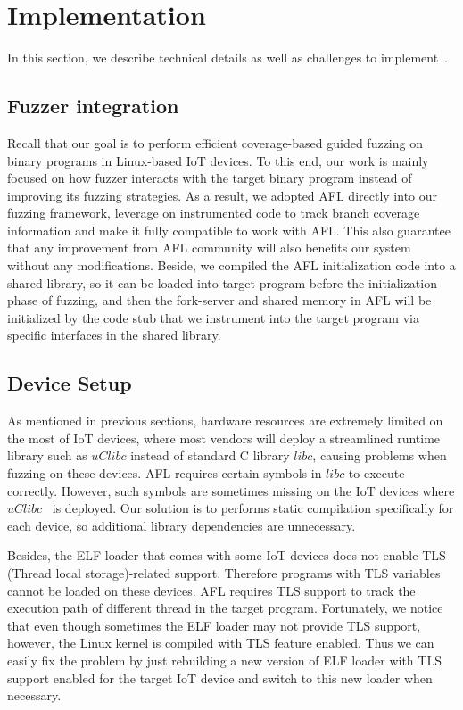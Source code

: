 \section{Implementation}\label{sec:impl}
In this section, we describe technical details as well as challenges to implement~\sysname. 

\subsection{Fuzzer integration}\label{sec:impl:integ}
Recall that our goal is to perform efficient coverage-based guided fuzzing on binary programs in Linux-based IoT devices. To this end, our work is mainly focused on
how fuzzer interacts with the target binary program instead of improving its fuzzing strategies. As a result, we adopted AFL directly into our fuzzing framework, leverage on instrumented code to track branch coverage information and make it fully compatible to work with AFL. This also guarantee that any improvement from AFL community will also benefits our system without any modifications. Beside, we compiled the AFL initialization code into a shared library, so it can be loaded into target program before the initialization phase of fuzzing, and then the fork-server and shared memory in AFL will be initialized by the code stub that we instrument into the target program via specific interfaces in the shared library.

\subsection{Device Setup}

As mentioned in previous sections, hardware resources are extremely limited on the most of IoT devices, where most vendors will deploy a streamlined runtime library such as $uClibc$ instead of standard C library $libc$, causing problems when fuzzing on these devices. AFL requires certain symbols in $libc$ to execute correctly. However, such symbols are sometimes missing on the IoT devices where $uClibc$~\cite{uclibc} is deployed. Our solution is to performs static compilation specifically for each device, so additional library dependencies are unnecessary.  

Besides, the ELF loader that comes with some IoT devices does not enable TLS (Thread local storage)-related support. Therefore programs with TLS variables cannot be loaded on these devices. AFL requires TLS support to track the execution path of different thread in the target program. Fortunately, we notice that even though sometimes the ELF loader may not provide TLS support, however, the Linux kernel is compiled with TLS feature enabled. Thus we can easily fix the problem by just rebuilding a new version of ELF loader with TLS support enabled for the target IoT device and switch to this new loader when necessary.

